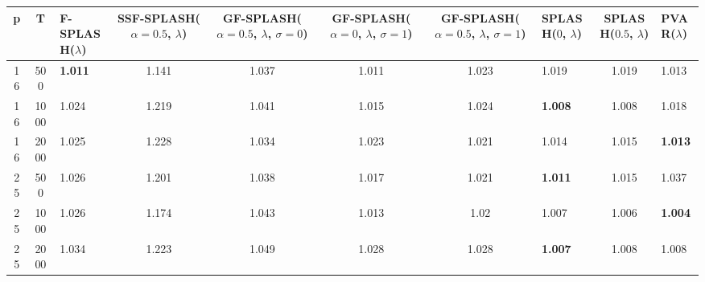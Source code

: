 \begin{tabular}{cclcccclcl}
\hline
  p  &  T   & F-SPLASH($\lambda$)   &  SSF-SPLASH($\alpha=0.5$, $\lambda$)  &  GF-SPLASH($\alpha=0.5$, $\lambda$, $\sigma=0$)  &  GF-SPLASH($\alpha=0$, $\lambda$, $\sigma=1$)  &  GF-SPLASH($\alpha=0.5$, $\lambda$, $\sigma=1$)  & SPLASH($0$, $\lambda$)   &  SPLASH($0.5$, $\lambda$)  & PVAR($\lambda$)   \\
\hline
 16  & 500  & \textbf{1.011}        &                 1.141                 &                      1.037                       &                     1.011                      &                      1.023                       & 1.019                    &           1.019            & 1.013             \\
 16  & 1000 & 1.024                 &                 1.219                 &                      1.041                       &                     1.015                      &                      1.024                       & \textbf{1.008}           &           1.008            & 1.018             \\
 16  & 2000 & 1.025                 &                 1.228                 &                      1.034                       &                     1.023                      &                      1.021                       & 1.014                    &           1.015            & \textbf{1.013}    \\
 25  & 500  & 1.026                 &                 1.201                 &                      1.038                       &                     1.017                      &                      1.021                       & \textbf{1.011}           &           1.015            & 1.037             \\
 25  & 1000 & 1.026                 &                 1.174                 &                      1.043                       &                     1.013                      &                       1.02                       & 1.007                    &           1.006            & \textbf{1.004}    \\
 25  & 2000 & 1.034                 &                 1.223                 &                      1.049                       &                     1.028                      &                      1.028                       & \textbf{1.007}           &           1.008            & 1.008             \\
\hline
\end{tabular}